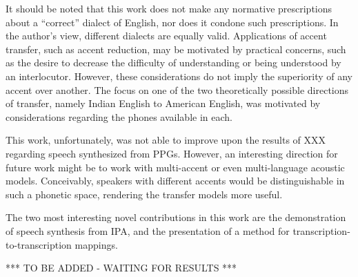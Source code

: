 %

It should be noted that this work does not make any normative prescriptions about a ``correct'' dialect of English,
nor does it condone such prescriptions. In the author's view, different dialects are equally valid.
Applications of accent transfer, such as accent reduction, may be motivated by practical concerns, such as the desire to decrease the difficulty 
of understanding or being understood by an interlocutor. However, these considerations do not imply the superiority 
of any accent over another. The focus on one of the two theoretically possible directions of transfer, 
namely Indian English to American English, was motivated by considerations regarding the phones available in each.

This work, unfortunately, was not able to improve upon the results of XXX regarding speech synthesized from PPGs. However, an interesting direction 
for future work might be to work with multi-accent or even multi-language acoustic models. Conceivably, 
speakers with different accents would be distinguishable in such a phonetic space, rendering the transfer models 
more useful.

The two most interesting novel contributions in this work are the demonstration of speech synthesis from 
IPA, and the presentation of a method for transcription-to-transcription mappings.

*** TO BE ADDED - WAITING FOR RESULTS ***

